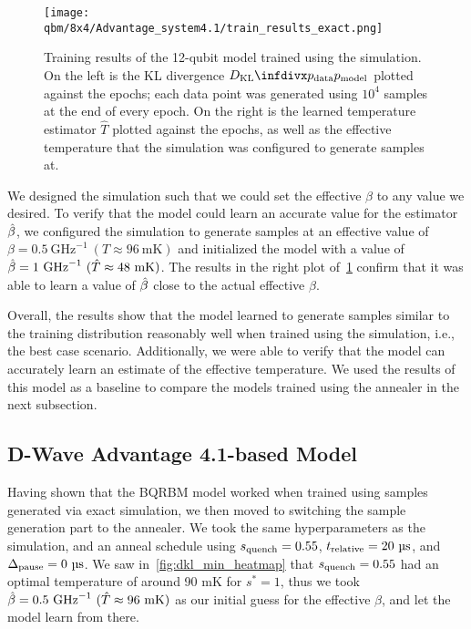 \begin{figure}[!htb]
    \begin{center}
        \texttt{[image: qbm/8x4/Advantage\_system4.1/train\_results\_exact.png]}
    \end{center}
    \caption{
        Training results of the 12-qubit model trained using the simulation.
        On the left is the KL divergence \( \DKL{\pdata}{\pmodel} \) plotted against the epochs; each data point was generated using \( 10^4 \) samples at the end of every epoch.
        On the right is the learned temperature estimator \( \hat{T} \) plotted against the epochs, as well as the effective temperature that the simulation was configured to generate samples at.
    }
    \label{fig:train_results_exact}
\end{figure}

We designed the simulation such that we could set the effective \( \beta \) to any value we desired.
To verify that the model could learn an accurate value for the estimator \( \hat{\beta} \), we configured the simulation to generate samples at an effective value of \( \beta = 0.5 \ \si{\giga\hertz}^{-1} \ (T \approx 96 \ \si{\milli\kelvin}) \) and initialized the model with a value of \( \hat{\beta} = 1 \ \si{\giga\hertz}^{-1} \ (\hat{T} \approx 48 \ \si{\milli\kelvin}) \).
The results in the right plot of~\cref{fig:train_results_exact} confirm that it was able to learn a value of \( \hat{\beta} \) close to the actual effective \( \beta \).

Overall, the results show that the model learned to generate samples similar to the training distribution reasonably well when trained using the simulation, i.e., the best case scenario.
Additionally, we were able to verify that the model can accurately learn an estimate of the effective temperature.
We used the results of this model as a baseline to compare the models trained using the annealer in the next subsection.

\subsection{D-Wave Advantage 4.1-based Model}
Having shown that the BQRBM model worked when trained using samples generated via exact simulation, we then moved to switching the sample generation part to the annealer.
We took the same hyperparameters as the simulation, and an anneal schedule using \( s_{\text{quench}} = 0.55 \), \( t_{\text{relative}} = 20 \ \si{\micro\second} \), and \( \Delta_{\text{pause}} = 0 \ \si{\micro\second} \).
We saw in~\cref{fig:dkl_min_heatmap} that \( s_{\text{quench}} = 0.55 \) had an optimal temperature of around 90 \si{\milli\kelvin} for \( s^* = 1 \), thus we took \( \betahat = 0.5 \ \si{\giga\hertz}^{-1} \ (\hat{T} \approx 96 \ \si{\milli\kelvin}) \) as our initial guess for the effective \( \beta \), and let the model learn from there.

